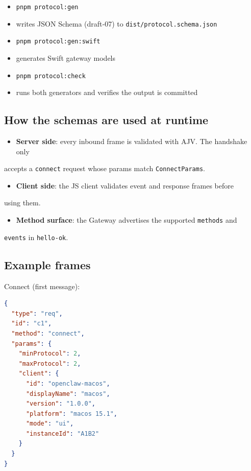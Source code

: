 \begin{itemize}
  \item \texttt{pnpm protocol:gen}
  \item writes JSON Schema (draft‑07) to \texttt{dist/protocol.schema.json}
  \item \texttt{pnpm protocol:gen:swift}
  \item generates Swift gateway models
  \item \texttt{pnpm protocol:check}
  \item runs both generators and verifies the output is committed
\end{itemize}


\subsection{How the schemas are used at runtime}


\begin{itemize}
  \item \textbf{Server side}: every inbound frame is validated with AJV. The handshake only
\end{itemize}

accepts a \texttt{connect} request whose params match \texttt{ConnectParams}.
\begin{itemize}
  \item \textbf{Client side}: the JS client validates event and response frames before
\end{itemize}

using them.
\begin{itemize}
  \item \textbf{Method surface}: the Gateway advertises the supported \texttt{methods} and
\end{itemize}

\texttt{events} in \texttt{hello-ok}.

\subsection{Example frames}


Connect (first message):

\begin{lstlisting}[language=json]
{
  "type": "req",
  "id": "c1",
  "method": "connect",
  "params": {
    "minProtocol": 2,
    "maxProtocol": 2,
    "client": {
      "id": "openclaw-macos",
      "displayName": "macos",
      "version": "1.0.0",
      "platform": "macos 15.1",
      "mode": "ui",
      "instanceId": "A1B2"
    }
  }
}
\end{lstlisting}


